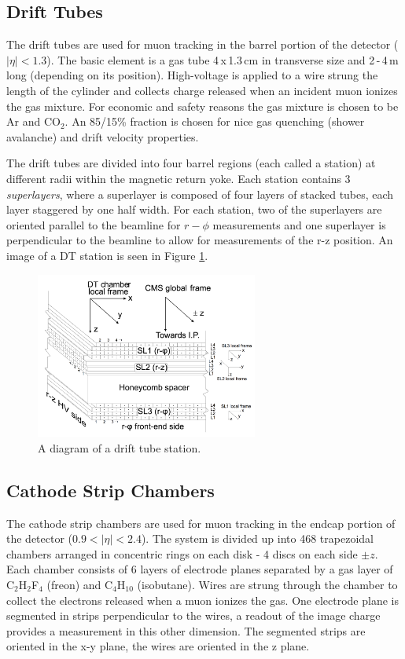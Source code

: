 \subsection{Drift Tubes}

The drift tubes are used for muon tracking in the barrel portion of the detector ($|\eta|<1.3$). The basic element is a gas tube 4$\,$x$\,$1.3$\,$cm in transverse size and 2$\,$-$\,$4$\,$m long (depending on its position). High-voltage is applied to a wire strung the length of the cylinder and collects charge released when an incident muon ionizes the gas mixture. For economic and safety reasons the gas mixture is chosen to be Ar and CO$_{2}$. An 85/15\% fraction is chosen for nice gas quenching (shower avalanche) and drift velocity properties. \cite{dtperformance}

The drift tubes are divided into four barrel regions (each called a station) at different radii within the magnetic return yoke. Each station contains 3 \textit{superlayers}, where a superlayer is composed of four layers of stacked tubes, each layer staggered by one half width. For each station, two of the superlayers are oriented parallel to the beamline for $r-\phi$ measurements and one superlayer is perpendicular to the beamline to allow for measurements of the r-z position. An image of a DT station is seen in Figure \ref{fig:superlayer}.

\begin{figure}[hbp!]
\centering
\includegraphics[width=0.65\textwidth]{figs/superlayer.png}
\caption{A diagram of a drift tube station.}
\label{fig:superlayer}
\end{figure}

\subsection{Cathode Strip Chambers}

The cathode strip chambers are used for muon tracking in the endcap portion of the detector ($0.9<|\eta|<2.4$). The system is divided up into 468 trapezoidal chambers arranged in concentric rings on each disk - 4 discs on each side $\pm z$. Each chamber consists of 6 layers of electrode planes separated by a gas layer of C$_{2}$H$_{2}$F$_{4}$ (freon) and C$_{4}$H$_{10}$ (isobutane). Wires are strung through the chamber to collect the electrons released when a muon ionizes the gas. One electrode plane is segmented in strips perpendicular to the wires, a readout of the image charge provides a measurement in this other dimension. The segmented strips are oriented in the x-y plane, the wires are oriented in the z plane. \cite{cscperformance}

